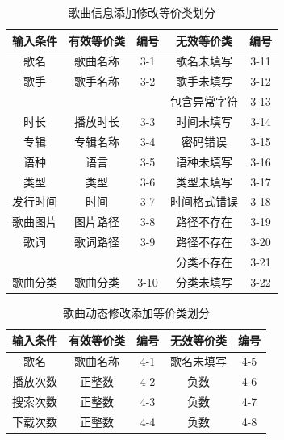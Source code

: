 \documentclass[UTF8,14pt]{article}
\numberwithin{figure}{subsubsection}
\numberwithin{table}{subsubsection}
\begin{document}
\begin{table}[H]
	\centering
	\begin{tabular}{|c|c|c|c|c|}
		\hline
		输入条件                   & 有效等价类                 & 编号                   & 无效等价类   & 编号 \\ \hline
		歌名                       & 歌曲名称                   & 3-1                    & 歌名未填写   & 3-11 \\ \hline
		歌手                       & 歌手名称                   & 3-2                    & 歌手未填写   & 3-12 \\ \hline
		                           &                            &                        & 包含异常字符 & 3-13 \\ \cline{4-5}
		\multirow{-2}{*}{时长}     & \multirow{-2}{*}{播放时长} & \multirow{-2}{*}{3-3}  & 时间未填写   & 3-14 \\ \hline
		专辑                       & 专辑名称                   & 3-4                    & 密码错误     & 3-15 \\ \hline
		语种                       & 语言                       & 3-5                    & 语种未填写   & 3-16 \\ \hline
		类型                       & 类型                       & 3-6                    & 类型未填写   & 3-17 \\ \hline
		发行时间                   & 时间                       & 3-7                    & 时间格式错误 & 3-18 \\ \hline
		歌曲图片                   & 图片路径                   & 3-8                    & 路径不存在   & 3-19 \\ \hline
		歌词                       & 歌词路径                   & 3-9                    & 路径不存在   & 3-20 \\ \hline
		                           &                            &                        & 分类不存在   & 3-21 \\ \cline{4-5}
		\multirow{-2}{*}{歌曲分类} & \multirow{-2}{*}{歌曲分类} & \multirow{-2}{*}{3-10} & 分类未填写   & 3-22 \\ \hline
	\end{tabular}
	\caption{歌曲信息添加修改等价类划分}
\end{table}

\begin{table}[H]
	\centering
	\begin{tabular}{|c|c|c|c|c|}
		\hline
		输入条件 & 有效等价类 & 编号 & 无效等价类 & 编号 \\ \hline
		歌名     & 歌曲名称   & 4-1  & 歌名未填写 & 4-5  \\ \hline
		播放次数 & 正整数     & 4-2  & 负数       & 4-6  \\ \hline
		搜索次数 & 正整数     & 4-3  & 负数       & 4-7  \\ \hline
		下载次数 & 正整数     & 4-4  & 负数       & 4-8  \\ \hline
	\end{tabular}
	\caption{歌曲动态修改添加等价类划分}
\end{table}
\end{document}
